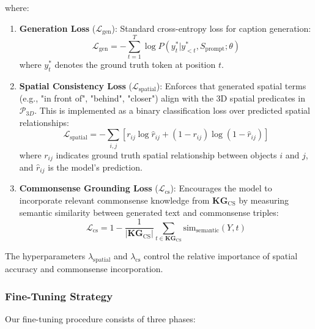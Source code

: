 \documentclass[runningheads,14pt]{llncs}
\begin{document}
where:
\begin{enumerate}
    \item \textbf{Generation Loss} ($\mathcal{L}_{\text{gen}}$): Standard cross-entropy loss for caption generation:
    \begin{equation}
    \mathcal{L}_{\text{gen}} = -\sum_{t=1}^{T} \log P(y_t^* | y_{<t}^*, S_{\text{prompt}}; \theta)
    \end{equation}
    where $y_t^*$ denotes the ground truth token at position $t$.
    
    \item \textbf{Spatial Consistency Loss} ($\mathcal{L}_{\text{spatial}}$): Enforces that generated spatial terms (e.g., "in front of", "behind", "closer") align with the 3D spatial predicates in $\mathcal{P}_{3D}$. This is implemented as a binary classification loss over predicted spatial relationships:
    \begin{equation}
    \mathcal{L}_{\text{spatial}} = -\sum_{i,j} \left[ r_{ij} \log \hat{r}_{ij} + (1-r_{ij}) \log(1-\hat{r}_{ij}) \right]
    \end{equation}
    where $r_{ij}$ indicates ground truth spatial relationship between objects $i$ and $j$, and $\hat{r}_{ij}$ is the model's prediction.
    
    \item \textbf{Commonsense Grounding Loss} ($\mathcal{L}_{\text{cs}}$): Encourages the model to incorporate relevant commonsense knowledge from $\mathbf{KG}_{\text{CS}}$ by measuring semantic similarity between generated text and commonsense triples:
    \begin{equation}
    \mathcal{L}_{\text{cs}} = 1 - \frac{1}{|\mathbf{KG}_{\text{CS}}|} \sum_{t \in \mathbf{KG}_{\text{CS}}} \text{sim}_{\text{semantic}}(Y, t)
    \end{equation}
\end{enumerate}

The hyperparameters $\lambda_{\text{spatial}}$ and $\lambda_{\text{cs}}$ control the relative importance of spatial accuracy and commonsense incorporation.

\subsubsection{Fine-Tuning Strategy}

Our fine-tuning procedure consists of three phases:
\end{document}
